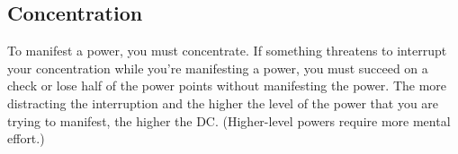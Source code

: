 \subsection{Concentration}
To manifest a power, you must concentrate. If something threatens to interrupt your concentration while you're manifesting a power, you must succeed on a  check or lose half of the power points without manifesting the power. The more distracting the interruption and the higher the level of the power that you are trying to manifest, the higher the DC. (Higher-level powers require more mental effort.)






